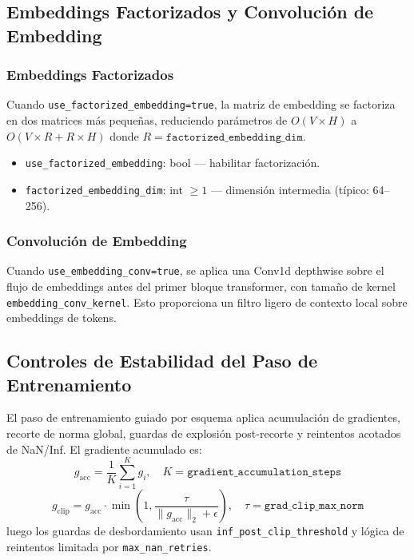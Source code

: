 \subsection{Embeddings Factorizados y Convolución de Embedding}

\subsubsection{Embeddings Factorizados}
Cuando \texttt{use\_factorized\_embedding=true}, la matriz de embedding se factoriza en dos matrices más pequeñas, reduciendo parámetros de $O(V \times H)$ a $O(V \times R + R \times H)$ donde $R = \texttt{factorized\_embedding\_dim}$.
\begin{itemize}[leftmargin=*]
    \item \texttt{use\_factorized\_embedding}: bool --- habilitar factorización.
    \item \texttt{factorized\_embedding\_dim}: int $\ge 1$ --- dimensión intermedia (típico: 64--256).
\end{itemize}

\subsubsection{Convolución de Embedding}
Cuando \texttt{use\_embedding\_conv=true}, se aplica una Conv1d depthwise sobre el flujo de embeddings antes del primer bloque transformer, con tamaño de kernel \texttt{embedding\_conv\_kernel}. Esto proporciona un filtro ligero de contexto local sobre embeddings de tokens.

\subsection{Controles de Estabilidad del Paso de Entrenamiento}

El paso de entrenamiento guiado por esquema aplica acumulación de gradientes, recorte de norma global, guardas de explosión post-recorte y reintentos acotados de NaN/Inf. El gradiente acumulado es:
\[
g_{\text{acc}}=\frac{1}{K}\sum_{i=1}^{K} g_i,\quad K=\texttt{gradient\_accumulation\_steps}
\]
\[
g_{\text{clip}} = g_{\text{acc}}\cdot
\min\left(1,\frac{\tau}{\|g_{\text{acc}}\|_2+\epsilon}\right),\quad
\tau=\texttt{grad\_clip\_max\_norm}
\]
luego los guardas de desbordamiento usan \texttt{inf\_post\_clip\_threshold} y lógica de reintentos limitada por \texttt{max\_nan\_retries}.

